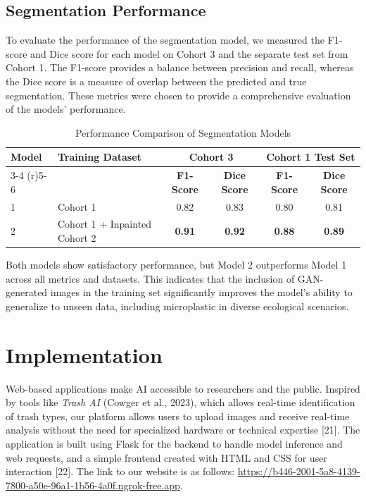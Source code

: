 \documentclass{article}
\begin{document}
\subsection{Segmentation Performance}
To evaluate the performance of the segmentation model, we measured the F1-score and Dice score for each model on Cohort 3 and the separate test set from Cohort 1. The F1-score provides a balance between precision and recall, whereas the Dice score is a measure of overlap between the predicted and true segmentation. These metrics were chosen to provide a comprehensive evaluation of the models' performance.

\begin{table}[H]
  \centering
  \begin{tabular}{ll|cc|cc}
    \toprule
    \textbf{Model} & \textbf{Training Dataset} & \multicolumn{2}{c|}{\textbf{Cohort 3}} & \multicolumn{2}{c}{\textbf{Cohort 1 Test Set}} \\
    \cmidrule(r){3-4} \cmidrule(r){5-6}
    & & \textbf{F1-Score} & \textbf{Dice Score} & \textbf{F1-Score} & \textbf{Dice Score} \\
    \midrule
    1 & Cohort 1 & 0.82 & 0.83 & 0.80 & 0.81 \\
    2 & Cohort 1 + Inpainted Cohort 2 & \textbf{0.91} & \textbf{0.92} & \textbf{0.88} & \textbf{0.89} \\
    \bottomrule
  \end{tabular}
  \caption{Performance Comparison of Segmentation Models}
  \label{performance-table}
\end{table}


Both models show satisfactory performance, but Model 2 outperforms Model 1 across all metrics and datasets. This indicates that the inclusion of GAN-generated images in the training set significantly improves the model's ability to generalize to unseen data, including microplastic in diverse ecological scenarios.

\section{Implementation}

Web-based applications make AI accessible to researchers and the public. Inspired by tools like \textit{Trash AI} (Cowger et al., 2023), which allows real-time identification of trash types, our platform allows users to upload images and receive real-time analysis without the need for specialized hardware or technical expertise [21]. The application is built using Flask for the backend to handle model inference and web requests, and a simple frontend created with HTML and CSS for user interaction [22]. The link to our website is as follows: \href{https://b446-2001-5a8-4139-7800-a50e-96a1-1b56-4a0f.ngrok-free.app}{https://b446-2001-5a8-4139-7800-a50e-96a1-1b56-4a0f.ngrok-free.app}.
\end{document}
